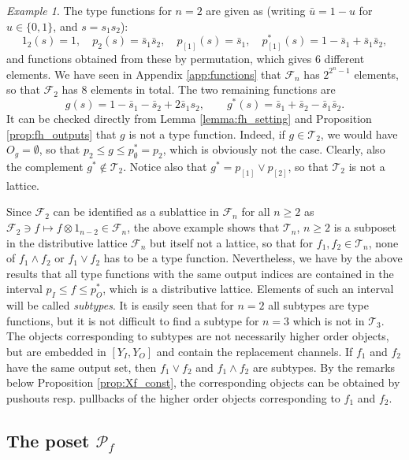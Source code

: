 \documentclass[12pt]{article}
\theoremstyle{definition}
\theoremstyle{remark}
\newtheorem{exm}{Example}
\def\Te{\mathcal T}
\def\Fe{\mathcal F}
\def\Pe{\mathcal P}
\begin{document}
\begin{exm}\label{exm:T2} The type functions for $n=2$ are given as (writing $\bar u=1-u$
for $u\in \{0,1\}$, and $s=s_1s_2$):
\[
1_2(s)=1,\quad p_{2}(s)=\bar s_1\bar s_2,\quad p_{[1]}(s)=\bar s_1, \quad 
p_{[1]}^*(s)= 1-\bar s_1+\bar
s_1\bar s_2,
\]
and functions  obtained from these by permutation, which gives 6 different elements.
We have seen in Appendix \ref{app:functions} that  $\Fe_n$ has $2^{2^n-1}$ elements, so that $\Fe_2$ has 8
elements in total. The two remaining functions  are
\[
g(s)=1-\bar s_1-\bar s_2+2\bar s_1s_2,\qquad g^*(s)=\bar s_1+\bar s_2-\bar s_1\bar s_2.
\]
It can be  checked directly from Lemma \ref{lemma:fh_setting} and
Proposition \ref{prop:fh_outputs} that $g$ is not a type function. Indeed, if $g\in \Te_2$, we would have $O_g=\emptyset$, so that
$p_{2}\le g\le p_\emptyset^*=p_{2}$, which is obviously not the case. Clearly, also the
complement $g^*\notin \Te_2$. Notice also that $g^*=p_{[1]}\vee p_{[2]}$, so that
$\Te_2$ is not a lattice. 

\end{exm}


Since $\Fe_2$ can be identified as a sublattice in $\Fe_n$ for
all $n\ge 2$ as $\Fe_2\ni f\mapsto f\otimes 1_{n-2}\in \Fe_n$, the above example shows
that  $\Te_n$, $n\ge 2$ is a  subposet in the distributive lattice 
$\Fe_n$ but itself not a lattice,  so that for $f_1,f_2\in
\Te_n$, none of $f_1\wedge f_2$ or $f_1\vee f_2$ has to be a type function.
Nevertheless, we have by the above results that all type functions with the same output
indices are contained in the interval $p_I\le f\le p_O^*$, which is a distributive
lattice. Elements of such an interval  will be called {\em subtypes}. It is easily seen
that for $n=2$ all subtypes are type functions, but it is not difficult to find a subtype
for $n=3$ which is not in $\Te_3$. The objects corresponding to
subtypes are not necessarily
higher order objects, but are embedded in  $[Y_I,Y_O]$ and contain the replacement
channels. If $f_1$ and $f_2$ have the same output set, then  $f_1\vee f_2$ and $f_1\wedge
f_2$ are subtypes. {By the remarks below Proposition \ref{prop:Xf_const}, the corresponding objects can be
obtained by pushouts resp. pullbacks of the higher order objects corresponding to $f_1$
and $f_2$.}




\subsection{The poset $\Pe_f$}
\end{document}
